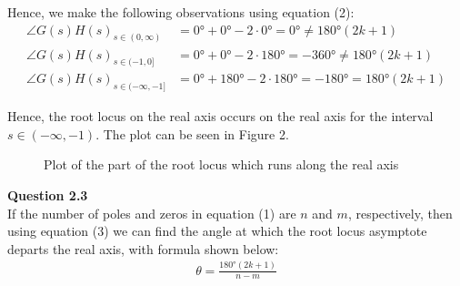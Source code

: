 \documentclass{article}
\begin{document}
	Hence, we make the following observations using equation (2):
	\begin{align*}
		\angle G(s)H(s)_{s \in (0,\infty)} &= 0\si{\degree} + 0\si{\degree} - 2 \cdot 0\si{\degree} = 0\si{\degree} \neq 180\si{\degree}(2k + 1)\\
		\angle G(s)H(s)_{s \in (-1,0]} &= 0\si{\degree} + 0\si{\degree} - 2 \cdot 180\si{\degree} = -360\si{\degree} \neq 180\si{\degree}(2k + 1)\\
		\angle G(s)H(s)_{s \in (-\infty,-1]} &= 0\si{\degree} + 180\si{\degree} - 2 \cdot 180\si{\degree} = -180\si{\degree} = 180\si{\degree}(2k + 1)
	\end{align*}
	
	Hence, the root locus on the real axis occurs on the real axis for the interval $s \in (-\infty, -1)$. The plot can be seen in Figure 2.
	
	\begin{figure}[h]
		\centering
		\caption{Plot of the part of the root locus which runs along the real axis}
	\end{figure}
	

	\newpage
    \textbf{Question 2.3}\\
    
    If the number of poles and zeros in equation (1) are $n$ and $m$, respectively, then using equation (3) we can find the angle at which the root locus asymptote departs the real axis, with formula shown below:
    \begin{align}
	    \theta = \frac{180\si{\degree}(2k + 1)}{n - m}
    \end{align}
    
\end{document}
